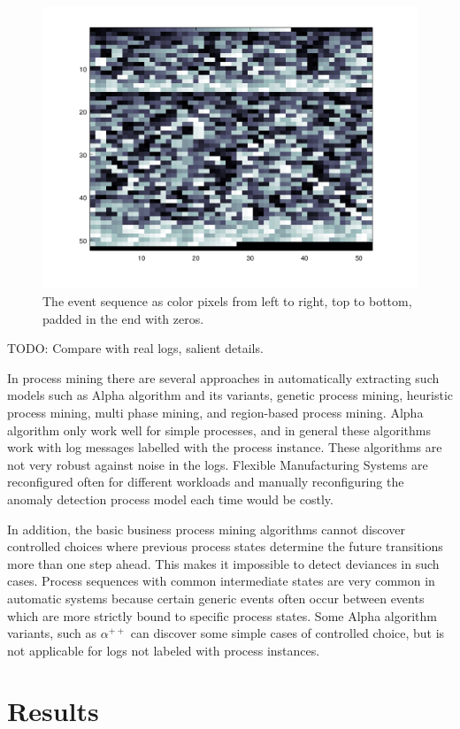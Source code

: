 \documentclass[journal]{IEEEtran}
\begin{document}
\begin{figure}[tb]
 \centering
 \includegraphics[width=8 cm,keepaspectratio=true]{./color_vis2.png}
 \caption{The event sequence as color pixels from left to right, top to bottom, padded in the end with zeros.}
 \label{figure:color_vis2}
\end{figure}

TODO: Compare with real logs, salient details.

In process mining there are several approaches in automatically extracting such models such as Alpha algorithm and its 
variants, genetic process mining, heuristic process mining, multi phase mining, and region-based process mining. Alpha algorithm only work well for simple processes,
and in general these algorithms work with log messages labelled with the process instance. These algorithms are not very robust against noise in the logs.
Flexible Manufacturing Systems are reconfigured often for different workloads and manually reconfiguring the anomaly
detection process model each time would be costly.

In addition, the basic business process mining algorithms cannot discover controlled choices where previous process states
determine the future transitions more than one step ahead. This makes it impossible to detect deviances in such cases. Process sequences with common intermediate states
are very common in automatic systems because certain generic events often occur between events which are more strictly bound to specific process states. Some Alpha algorithm
variants, such as $\alpha^{++}$ \cite{wen2007mining} can discover some simple cases of controlled choice, but is not applicable for logs not labeled with process instances.

\section{Results}
\end{document}
